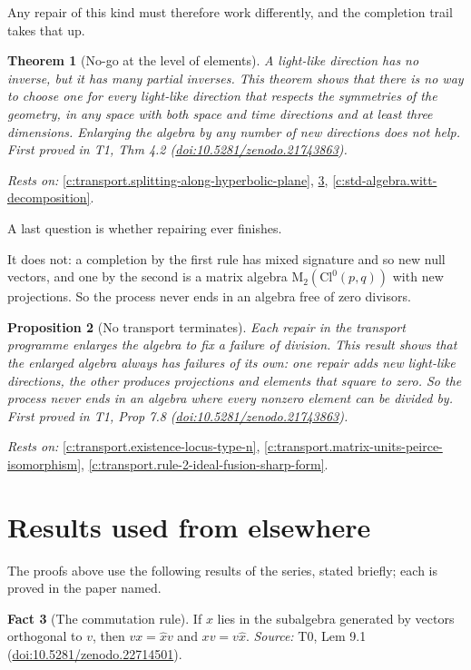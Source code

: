 \documentclass[11pt]{article}
\newtheorem{theorem}{Theorem}[section]
\newtheorem{proposition}[theorem]{Proposition}
\theoremstyle{definition}
\newtheorem{fact}[theorem]{Fact}
\theoremstyle{plain}
\providecommand{\Cl}{}\renewcommand{\Cl}{\mathrm{Cl}}
\providecommand{\Mat}{}\renewcommand{\Mat}{\mathrm{M}}
\begin{document}
Any repair of this kind must therefore work differently, and the completion trail takes that up.

\begin{theorem}[No-go at the level of elements]\label{c:transport.no-go-level-elements}
A light-like direction has no inverse, but it has many partial inverses. This theorem shows that there is no way to choose one for every light-like direction that respects the symmetries of the geometry, in any space with both space and time directions and at least three dimensions. Enlarging the algebra by any number of new directions does not help.
\emph{First proved in} T1, Thm 4.2 (\href{https://doi.org/10.5281/zenodo.21743863}{doi:10.5281/zenodo.21743863}).
\end{theorem}
\noindent\emph{Rests on:} \ref{c:transport.splitting-along-hyperbolic-plane}, \ref{c:primer.commutation-rule}, \ref{c:std-algebra.witt-decomposition}.

A last question is whether repairing ever finishes.

It does not: a completion by the first rule has mixed signature and so new null vectors, and one by the second is a matrix algebra $\Mat_2(\Cl^0(p,q))$ with new projections. So the process never ends in an algebra free of zero divisors.

\begin{proposition}[No transport terminates]\label{c:transport.no-transport-terminates}
Each repair in the transport programme enlarges the algebra to fix a failure of division. This result shows that the enlarged algebra always has failures of its own: one repair adds new light-like directions, the other produces projections and elements that square to zero. So the process never ends in an algebra where every nonzero element can be divided by.
\emph{First proved in} T1, Prop 7.8 (\href{https://doi.org/10.5281/zenodo.21743863}{doi:10.5281/zenodo.21743863}).
\end{proposition}
\noindent\emph{Rests on:} \ref{c:transport.existence-locus-type-n}, \ref{c:transport.matrix-units-peirce-isomorphism}, \ref{c:transport.rule-2-ideal-fusion-sharp-form}.

\section{Results used from elsewhere}
The proofs above use the following results of the series, stated briefly; each is proved in the paper named.

\begin{fact}[The commutation rule]\label{c:primer.commutation-rule}
If $x$ lies in the subalgebra generated by vectors orthogonal to $v$, then $v x = \hat{x} v$ and $x v = v \hat{x}$.
\emph{Source:} T0, Lem 9.1 (\href{https://doi.org/10.5281/zenodo.22714501}{doi:10.5281/zenodo.22714501}).
\end{fact}
\end{document}
